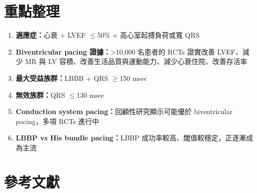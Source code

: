 \documentclass[12pt,a4paper]{article}
\begin{document}
\section{重點整理}

\begin{tcolorbox}[
    colback=emergency_red!5!white,
    colframe=emergency_red,
    title=\textbf{Key Points: Physiologic Pacing in Heart Failure},
    fonttitle=\bfseries
]
\begin{enumerate}
    \item \textbf{適應症：}心衰 + LVEF $\leq$50\% + 高心室起搏負荷或寬 QRS

    \item \textbf{Biventricular pacing 證據：}>10,000 名患者的 RCTs 證實改善 LVEF、減少 MR 與 LV 容積、改善生活品質與運動能力、減少心衰住院、改善存活率

    \item \textbf{最大受益族群：}LBBB + QRS $\geq$150 msec

    \item \textbf{無效族群：}QRS $\leq$130 msec

    \item \textbf{Conduction system pacing：}回顧性研究顯示可能優於 biventricular pacing，多項 RCTs 進行中

    \item \textbf{LBBP vs His bundle pacing：}LBBP 成功率較高、閾值較穩定，正逐漸成為主流
\end{enumerate}
\end{tcolorbox}

\section{參考文獻}
\end{document}
